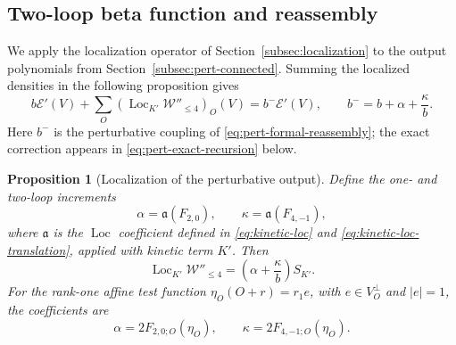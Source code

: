 \documentclass[11pt]{article}
\newcommand{\Loc}{\operatorname{Loc}}
\numberwithin{equation}{section}
\newtheorem{proposition}[theorem]{Proposition}
\theoremstyle{definition}
\theoremstyle{plain}
\begin{document}
\subsection{Two-loop beta function and reassembly}
\label{subsec:pert-beta}

We apply the localization operator of
Section~\ref{subsec:localization} to the output polynomials from
Section~\ref{subsec:pert-connected}.
Summing the localized densities in the following proposition gives
\begin{equation}
 b\mathcal E'(V)+\sum_O(\Loc_{K'}\mathcal W''_{\le4})_O(V)
 =b^-\mathcal E'(V),\qquad b^-=b+\alpha+\frac{\kappa}{b}.
 \label{eq:pert-bminus}
\end{equation}
Here $b^-$ is the perturbative coupling of
\eqref{eq:pert-formal-reassembly}; the exact correction appears in
\eqref{eq:pert-exact-recursion} below.

\begin{proposition}[Localization of the perturbative output]
\label{prop:beta-localization}
Define the one- and two-loop increments
\begin{equation}
 \alpha=\mathfrak a(F_{2,0}),\qquad
 \kappa=\mathfrak a(F_{4,-1}),
 \label{eq:beta-moments}
\end{equation}
where $\mathfrak a$ is the $\Loc$ coefficient defined in
\eqref{eq:kinetic-loc} and \eqref{eq:kinetic-loc-translation},
applied with kinetic term $K'$.
Then 
\begin{equation}
 \Loc_{K'}\mathcal W''_{\le4}
 =\left(\alpha+\frac{\kappa}{b}\right)S_{K'}.
 \label{eq:beta-localization}
\end{equation}
For the rank-one affine test function
$\eta_O(O+r)=r_1e$, with $e\in V_O^\perp$ and $|e|=1$,
the coefficients are
\begin{equation}
 \alpha=2F_{2,0;O}(\eta_O),\qquad
 \kappa=2F_{4,-1;O}(\eta_O).
 \label{eq:beta-affine-test}
\end{equation}
\end{proposition}
\end{document}
